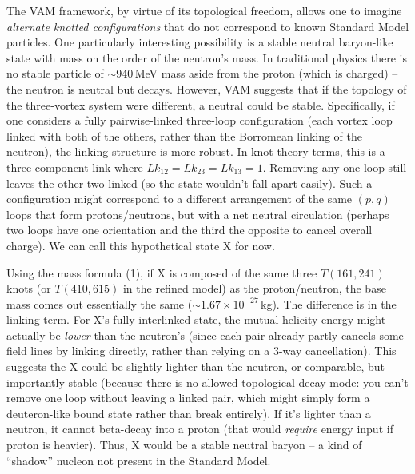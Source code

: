 The VAM framework, by virtue of its topological freedom, allows one to imagine \textit{alternate knotted configurations} that do not correspond to known Standard Model particles. One particularly interesting possibility is a stable neutral baryon-like state with mass on the order of the neutron's mass. In traditional physics there is no stable particle of $\sim$940\,MeV mass aside from the proton (which is charged) -- the neutron is neutral but decays. However, VAM suggests that if the topology of the three-vortex system were different, a neutral could be stable. Specifically, if one considers a fully pairwise-linked three-loop configuration (each vortex loop linked with both of the others, rather than the Borromean linking of the neutron), the linking structure is more robust. In knot-theory terms, this is a three-component link where $Lk_{12}=Lk_{23}=Lk_{13}=1$. Removing any one loop still leaves the other two linked (so the state wouldn't fall apart easily). Such a configuration might correspond to a different arrangement of the same $(p,q)$ loops that form protons/neutrons, but with a net neutral circulation (perhaps two loops have one orientation and the third the opposite to cancel overall charge). We can call this hypothetical state X for now.

Using the mass formula (1), if X is composed of the same three $T(161,241)$ knots (or $T(410,615)$ in the refined model) as the proton/neutron, the base mass comes out essentially the same ($\sim$$1.67\times10^{-27}$\,kg). The difference is in the linking term. For X's fully interlinked state, the mutual helicity energy might actually be \textit{lower} than the neutron's (since each pair already partly cancels some field lines by linking directly, rather than relying on a 3-way cancellation). This suggests the X could be slightly lighter than the neutron, or comparable, but importantly stable (because there is no allowed topological decay mode: you can't remove one loop without leaving a linked pair, which might simply form a deuteron-like bound state rather than break entirely). If it's lighter than a neutron, it cannot beta-decay into a proton (that would \textit{require} energy input if proton is heavier). Thus, X would be a stable neutral baryon -- a kind of ``shadow'' nucleon not present in the Standard Model.


